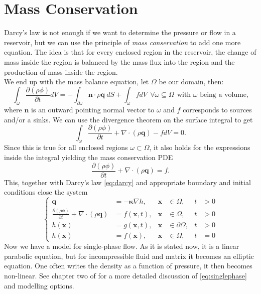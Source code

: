 \documentclass[../Main/main.tex]{subfiles}
\begin{document}
\section{Mass Conservation}
Darcy's law is not enough if we want to determine the pressure or flow in a reservoir, but we can use the principle of \emph{mass conservation} to add one more equation. 
The idea is that for every enclosed region in the reservoir, the change of mass inside the region is balanced by the mass flux into the region and the production of mass inside the region.
\\
We end up with the mass balance equation, let $\Omega$ be our domain, then:
\begin{equation*}
\int_{\omega}\frac{\partial (\rho \phi) }{\partial t} dV= -\int_{\partial\omega}\bm{n}\cdot\rho\bm{q} \ dS+\int_{\omega} f dV \ \ \forall \omega \subseteq \Omega \ \ \text{with }\omega \text{ being a volume,}
\end{equation*}
where $\bm{n}$ is an outward pointing normal vector to $\omega$ and $f$ corresponds to sources and/or a sinks. We can use the divergence theorem on the surface integral to get
\begin{equation*}
\int_{\omega}\frac{\partial (\rho \phi) }{\partial t} + \nabla \cdot(\rho \bm{q}) -fdV= 0.
\end{equation*}
Since this is true for all enclosed regions $\omega\subset \Omega$, it also holds for the expressions inside the integral yielding the mass conservation PDE
\begin{equation*}
\frac{\partial (\rho \phi) }{\partial t} + \nabla \cdot (\rho \bm{q}) = f.
\end{equation*}
This, together with Darcy's law \eqref{eq:darcy} and appropriate boundary and initial conditions close the system
\begin{equation}\label{eq:singlephase}
\left \{ \begin{aligned}
	\bm{q} &=-\bm{\kappa} \nabla h, & \bm{x} &\in \Omega,  &t &>0 \\
	\frac{\partial (\rho \phi) }{\partial t} + \nabla \cdot(\rho \bm{q}) &=f(\bm{x},t), & \bm{x} &\in \Omega, & t &>0 \\
	h(\bm{x}) &= g(\bm{x},t), &\bm{x} &\in \partial \Omega,&t &>0 \\
	h(\bm{x}) &= f(\bm{x}), & 	\bm{x} &\in \Omega,  &	t &=0 
\end{aligned}\right. 
\end{equation}
Now we have a model for single-phase flow. As it is stated now, it is a linear parabolic equation, but for incompressible fluid and matrix it becomes an elliptic equation. One often writes the density as a function of pressure, it then becomes non-linear. See chapter two of \cite{Nordbotten} for a more detailed discussion of \eqref{eq:singlephase} and modelling options.
\end{document}
